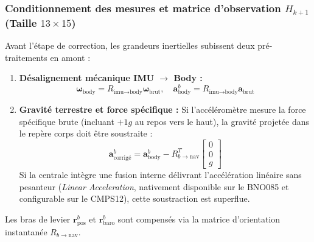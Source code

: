 \documentclass[../Formulations_Kalman.tex]{subfiles}
\begin{document}
\subsubsection{Conditionnement des mesures et matrice d'observation $H_{k+1}$ (Taille $13 \times 15$)}
Avant l'étape de correction, les grandeurs inertielles subissent deux pré-traitements en amont :
\begin{enumerate}
    \item \textbf{Désalignement mécanique IMU $\to$ Body :}
    \begin{equation}
    \boldsymbol{\omega}_{\text{body}} = R_{\text{imu} \to \text{body}} \boldsymbol{\omega}_{\text{brut}}, \quad \mathbf{a}_{\text{body}}^b = R_{\text{imu} \to \text{body}} \mathbf{a}_{\text{brut}}
    \end{equation}
    \item \textbf{Gravité terrestre et force spécifique :}
    Si l'accéléromètre mesure la force spécifique brute (incluant $+1g$ au repos vers le haut), la gravité projetée dans le repère corps doit être soustraite :
    \begin{equation}
    \mathbf{a}_{\text{corrigé}}^b = \mathbf{a}_{\text{body}}^b - R_{b \to \text{nav}}^T \begin{bmatrix} 0 \\ 0 \\ g \end{bmatrix}
    \end{equation}
    Si la centrale intègre une fusion interne délivrant l'accélération linéaire sans pesanteur (\textit{Linear Acceleration}, nativement disponible sur le BNO085 et configurable sur le CMPS12), cette soustraction est superflue.
\end{enumerate}

Les bras de levier $\mathbf{r}_{\text{pos}}^b$ et $\mathbf{r}_{\text{baro}}^b$ sont compensés via la matrice d'orientation instantanée $R_{b \to \text{nav}}$.
\end{document}
